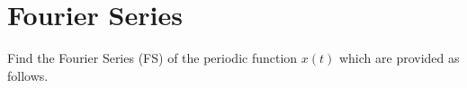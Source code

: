 \documentclass[a4paper, 10pt]{article}
\begin{document}
\subject[2110203 - Computer Engineering Mathematics II]


\section{Fourier Series}



\begin{problem}[2]
Find the Fourier Series (FS) of the periodic function \( x(t) \) which are provided as follows.
\end{problem}
\end{document}
